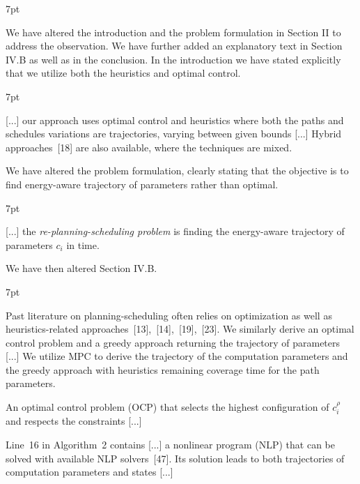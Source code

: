 \documentclass[10pt]{letter}
\newenvironment{formal}{%
  \def\FrameCommand{%
    \hspace{1pt}%
    {\color{red}\vrule width 2pt}%
    {\color{formalshade}\vrule width 4pt}%
    \colorbox{formalshade}%
  }%
  \MakeFramed{\advance\hsize-\width\FrameRestore}%
  \noindent\hspace{-4.55pt}%
  \begin{adjustwidth}{}{7pt}%
  \vspace{2pt}\vspace{2pt}%
}
{%
  \vspace{2pt}\end{adjustwidth}\endMakeFramed%
}
\begin{document}
{\begin{formal}
\begin{algorithmic}[1]
    \vspace*{.8ex}
  \end{algorithmic}
\end{formal}

  We have altered the introduction and the problem formulation in Section II to address the observation. We have further added an explanatory text in Section IV.B as well as in the conclusion. In the introduction we have stated explicitly that we utilize both the heuristics and optimal control.

  \begin{formal}
  {\color{black} [...] our approach uses optimal control {\color{blue} and heuristics} where both the paths and schedules variations are trajectories, varying between given bounds [...]} Hybrid approaches~[{\color{green}18}] are also available, where the techniques are mixed.
  \vspace*{1ex}
  \end{formal}

  We have altered the problem formulation, clearly stating that the objective is to find energy-aware trajectory of parameters rather than optimal.

  \begin{formal}
    {\color{black} [...] the \emph{re-planning-scheduling problem} is finding the {\color{blue}energy-aware} trajectory of parameters $c_i$ in time.}
    \vspace*{1ex}
  \end{formal}

  We have then altered Section IV.B.

  \begin{formal}
  \color{black}
  Past literature on planning-scheduling often relies on %
  optimization {\color{blue} as well as heuristics-}related approaches~[{\color{green}13}],~[{\color{green}14}],~[{\color{green}19}],~[{\color{green}23}]. We similarly derive an optimal control problem {\color{blue}and a greedy approach} returning the trajectory of parameters [...] {\color{blue} We utilize MPC to derive the trajectory of the computation parameters and the greedy approach with heuristics remaining coverage time for the path parameters.}

  An optimal control problem (OCP) that selects the highest configuration of {\color{blue} $c_i^\rho$} and respects the constraints [...]

  Line~{\color{red}16} in Algorithm~{\color{red}2} contains [...] a nonlinear program (NLP) that can be solved with available NLP solvers~[{\color{green}47}]. Its solution leads to both trajectories of {\color{blue} computation} parameters and states [...]
  

\end{formal}}
\end{document}
